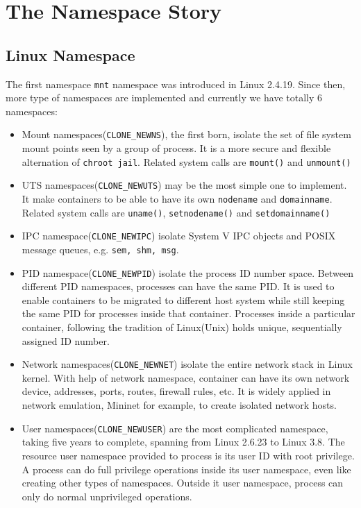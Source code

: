 \documentclass{acm_proc_article-sp}
\begin{document}
\section{The Namespace Story}

\subsection{Linux Namespace}
The first namespace \texttt{mnt} namespace was introduced in Linux 2.4.19. 
Since then, more type of namespaces are implemented and currently we have totally 6 namespaces:
\begin{itemize}
\item Mount namespaces(\texttt{CLONE\_NEWNS}), the first born, isolate the set of file system mount points seen by a group of process\cite{lwn:namespace:overview}. 
It is a more secure and flexible alternation of \texttt{chroot jail}. Related system calls are \texttt{mount()} and \texttt{unmount()}
\item UTS namespaces(\texttt{CLONE\_NEWUTS}) may be the most simple one to implement. It make containers to be able to have its own \texttt{nodename} and \texttt{domainname}\cite{lwn:namespace:overview}. 
Related system calls are \texttt{uname()}, \texttt{setnodename()} and \texttt{setdomainname()} 
\item IPC namespace(\texttt{CLONE\_NEWIPC}) isolate System V IPC objects and POSIX message queues, e.g. \texttt{sem, shm, msg}. 
\item PID namespace(\texttt{CLONE\_NEWPID}) isolate the process ID number space. 
Between different PID namespaces, processes can have the same PID. 
It is used to enable containers to be migrated to different host system while still keeping the same PID for processes inside that container. 
Processes inside a particular container, following the tradition of Linux(Unix) holds unique, sequentially assigned ID number.\cite{lwn:namespace:pid}
\item Network namespaces(\texttt{CLONE\_NEWNET}) isolate the entire network stack in Linux kernel. With help of network namespace, container can have its own network device, addresses, ports, routes, firewall rules, etc\cite{lwn:namespace:net}. 
It is widely applied in network emulation, Mininet\cite{mininet} for example, to create isolated network hosts.
\item User namespaces(\texttt{CLONE\_NEWUSER}) are the most complicated namespace, taking five years to complete, spanning from Linux 2.6.23 to Linux 3.8\cite{lwn:namespace:user}. 
The resource user namespace provided to process is its user ID with root privilege. 
A process can do full privilege operations inside its user namespace, even like creating other types of namespaces. Outside it user namespace, process can only do normal unprivileged operations.
\end{itemize}
\end{document}

